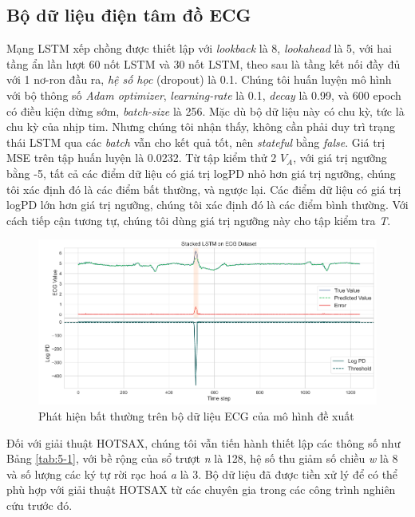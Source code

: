 \subsection{Bộ dữ liệu điện tâm đồ ECG}
Mạng LSTM xếp chồng được thiết lập với \textit{lookback} là 8, \textit{lookahead} là 5, với hai tầng ẩn lần lượt 60 nốt LSTM và 30 nốt LSTM, theo sau là tầng kết nối đầy đủ với 1 nơ-ron đầu ra, \textit{hệ số học} (dropout) là 0.1. Chúng tôi huấn luyện mô hình với bộ thông số \textit{Adam optimizer}, \textit{learning-rate} là 0.1, \textit{decay} là 0.99, và 600 epoch có điều kiện dừng sớm, \textit{batch-size} là 256. Mặc dù bộ dữ liệu này có chu kỳ, tức là chu kỳ của nhịp tim. Nhưng chúng tôi nhận thấy, không cần phải duy trì trạng thái LSTM qua các \textit{batch} vẫn cho kết quả tốt, nên \textit{stateful} bằng \textit{false}. Giá trị MSE trên tập huấn luyện là 0.0232. Từ tập kiểm thử 2 $V_{A}$, với giá trị ngưỡng bằng -5, tất cả các điểm dữ liệu có giá trị logPD nhỏ hơn giá trị ngưỡng, chúng tôi xác định đó là các điểm bất thường, và ngược lại. Các điểm dữ liệu có giá trị logPD lớn hơn giá trị ngưỡng, chúng tôi xác định đó là các điểm bình thường. Với cách tiếp cận tương tự, chúng tôi dùng giá trị ngưỡng này cho tập kiểm tra \textit{T}.

\begin{figure}[H]
    \centering
    \includegraphics[scale=1]{./content/images/5-7.png}
    \caption{Phát hiện bất thường trên bộ dữ liệu ECG của mô hình đề xuất}
    \label{fig:5-7}
\end{figure}

Đối với giải thuật HOTSAX, chúng tôi vẫn tiến hành thiết lập các thông số như Bảng \ref{tab:5-1}, với bề rộng của sổ trượt \textit{n} là 128, hệ số thu giảm số chiều \textit{w} là 8 và số lượng các ký tự rời rạc hoá \textit{a} là 3. Bộ dữ liệu đã được tiền xử lý để có thể phù hợp với giải thuật HOTSAX từ các chuyên gia trong các công trình nghiên cứu trước đó.

